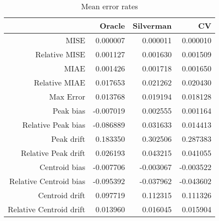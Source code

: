 \begin{table}[ht]
\centering
\begin{tabular}{rrrr}
  \hline
 & Oracle & Silverman & CV \\ 
  \hline
MISE & 0.000007 & 0.000011 & 0.000010 \\ 
  Relative MISE & 0.001127 & 0.001630 & 0.001509 \\ 
  MIAE & 0.001426 & 0.001718 & 0.001650 \\ 
  Relative MIAE & 0.017653 & 0.021262 & 0.020430 \\ 
  Max Error & 0.013768 & 0.019194 & 0.018128 \\ 
  Peak bias & -0.007019 & 0.002555 & 0.001164 \\ 
  Relative Peak bias & -0.086889 & 0.031633 & 0.014413 \\ 
  Peak drift & 0.183350 & 0.302506 & 0.287383 \\ 
  Relative Peak drift & 0.026193 & 0.043215 & 0.041055 \\ 
  Centroid bias & -0.007706 & -0.003067 & -0.003522 \\ 
  Relative Centroid bias & -0.095392 & -0.037962 & -0.043602 \\ 
  Centroid drift & 0.097719 & 0.112315 & 0.111326 \\ 
  Relative Centroid drift & 0.013960 & 0.016045 & 0.015904 \\ 
   \hline
\end{tabular}
\caption{Mean error rates} 
\label{tbl:mean_error_rates}
\end{table}
